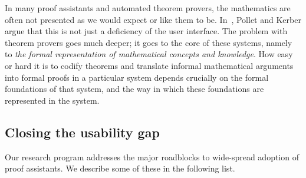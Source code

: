\documentclass[11pt]{amsart}  %
\begin{document}
In many proof assistants and automated theorem provers, the mathematics are often not presented as we would expect or like them to be. In~\cite{PolletKerber:2007}, Pollet and Kerber argue that this is not just a deficiency of the user interface. The problem with theorem provers goes much deeper; it goes to the core of these systems, namely to \emph{the formal representation of mathematical concepts and knowledge}. How easy or hard it is to codify theorems and translate informal mathematical arguments into formal proofs in a particular system depends crucially on the 
formal foundations of that system, and the way in which these foundations are represented in the system.

\subsection{Closing the usability gap}
Our research program addresses the major roadblocks to wide-spread adoption of proof assistants.  We describe some of these in the following list.
\end{document}

